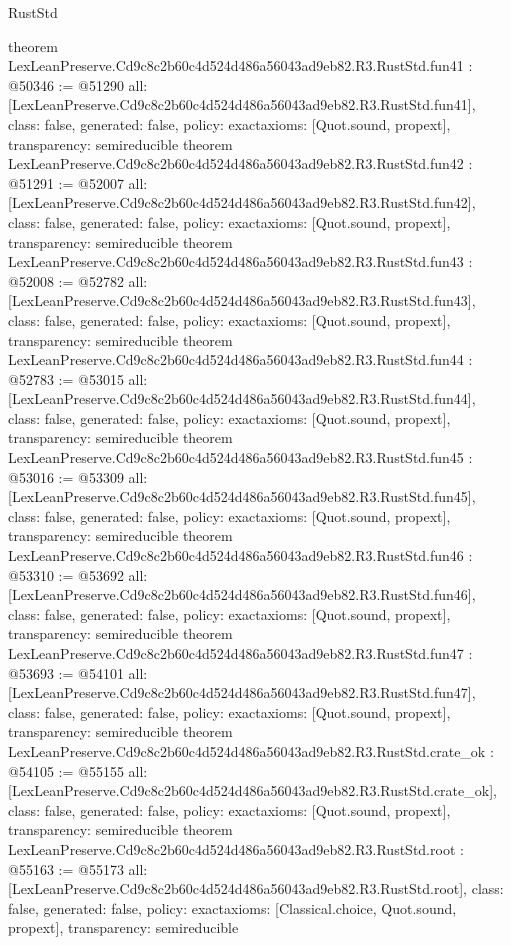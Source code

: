 \begin{lexlean}{RustStd}
\begin{coremodule}
{}
theorem LexLeanPreserve.Cd9c8c2b60c4d524d486a56043ad9eb82.R3.RustStd.fun41 : @50346 := @51290 {
  all: [LexLeanPreserve.Cd9c8c2b60c4d524d486a56043ad9eb82.R3.RustStd.fun41],
  class: false,
  generated: false,
  policy: exact{axioms: [Quot.sound, propext]},
  transparency: semireducible
}
theorem LexLeanPreserve.Cd9c8c2b60c4d524d486a56043ad9eb82.R3.RustStd.fun42 : @51291 := @52007 {
  all: [LexLeanPreserve.Cd9c8c2b60c4d524d486a56043ad9eb82.R3.RustStd.fun42],
  class: false,
  generated: false,
  policy: exact{axioms: [Quot.sound, propext]},
  transparency: semireducible
}
theorem LexLeanPreserve.Cd9c8c2b60c4d524d486a56043ad9eb82.R3.RustStd.fun43 : @52008 := @52782 {
  all: [LexLeanPreserve.Cd9c8c2b60c4d524d486a56043ad9eb82.R3.RustStd.fun43],
  class: false,
  generated: false,
  policy: exact{axioms: [Quot.sound, propext]},
  transparency: semireducible
}
theorem LexLeanPreserve.Cd9c8c2b60c4d524d486a56043ad9eb82.R3.RustStd.fun44 : @52783 := @53015 {
  all: [LexLeanPreserve.Cd9c8c2b60c4d524d486a56043ad9eb82.R3.RustStd.fun44],
  class: false,
  generated: false,
  policy: exact{axioms: [Quot.sound, propext]},
  transparency: semireducible
}
theorem LexLeanPreserve.Cd9c8c2b60c4d524d486a56043ad9eb82.R3.RustStd.fun45 : @53016 := @53309 {
  all: [LexLeanPreserve.Cd9c8c2b60c4d524d486a56043ad9eb82.R3.RustStd.fun45],
  class: false,
  generated: false,
  policy: exact{axioms: [Quot.sound, propext]},
  transparency: semireducible
}
theorem LexLeanPreserve.Cd9c8c2b60c4d524d486a56043ad9eb82.R3.RustStd.fun46 : @53310 := @53692 {
  all: [LexLeanPreserve.Cd9c8c2b60c4d524d486a56043ad9eb82.R3.RustStd.fun46],
  class: false,
  generated: false,
  policy: exact{axioms: [Quot.sound, propext]},
  transparency: semireducible
}
theorem LexLeanPreserve.Cd9c8c2b60c4d524d486a56043ad9eb82.R3.RustStd.fun47 : @53693 := @54101 {
  all: [LexLeanPreserve.Cd9c8c2b60c4d524d486a56043ad9eb82.R3.RustStd.fun47],
  class: false,
  generated: false,
  policy: exact{axioms: [Quot.sound, propext]},
  transparency: semireducible
}
theorem LexLeanPreserve.Cd9c8c2b60c4d524d486a56043ad9eb82.R3.RustStd.crate_ok : @54105 := @55155 {
  all: [LexLeanPreserve.Cd9c8c2b60c4d524d486a56043ad9eb82.R3.RustStd.crate_ok],
  class: false,
  generated: false,
  policy: exact{axioms: [Quot.sound, propext]},
  transparency: semireducible
}
theorem LexLeanPreserve.Cd9c8c2b60c4d524d486a56043ad9eb82.R3.RustStd.root : @55163 := @55173 {
  all: [LexLeanPreserve.Cd9c8c2b60c4d524d486a56043ad9eb82.R3.RustStd.root],
  class: false,
  generated: false,
  policy: exact{axioms: [Classical.choice, Quot.sound, propext]},
  transparency: semireducible
}


\end{coremodule}
\end{lexlean}
